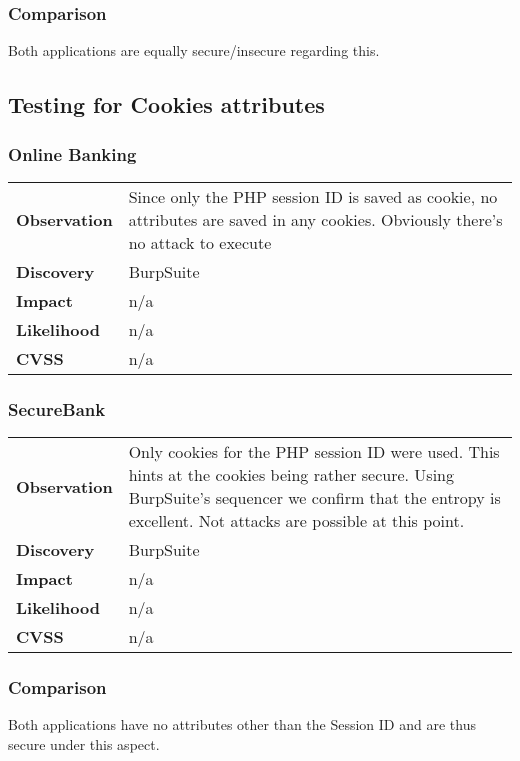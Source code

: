 \subsubsection*{Comparison}
Both applications are equally secure/insecure regarding this.


\subsection{Testing for Cookies attributes}

\subsubsection*{Online Banking}

\begin{tabular}{l|p{10cm}}
\textbf{Observation} & Since only the PHP session ID is saved as cookie, no attributes are saved in any cookies. Obviously there's no attack to execute  \\
\textbf{Discovery} & BurpSuite \\
\textbf{Impact} & n/a \\
\textbf{Likelihood} & n/a \\
\textbf{CVSS} & n/a \\
\end{tabular}

\subsubsection*{SecureBank}

\begin{tabular}{l|p{10cm}}
\textbf{Observation} & Only cookies for the PHP session ID were used. This hints at the cookies being rather secure. Using BurpSuite's sequencer we confirm that the entropy is excellent. Not attacks are possible at this point. \\
\textbf{Discovery} & BurpSuite \\
\textbf{Impact} & n/a \\
\textbf{Likelihood} & n/a \\
\textbf{CVSS} & n/a \\
\end{tabular}

\subsubsection*{Comparison}
Both applications have no attributes other than the Session ID and are thus secure under this aspect.


